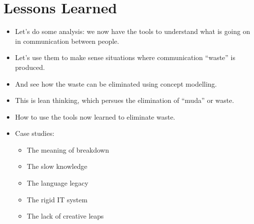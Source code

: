 \section{Lessons Learned}
\begin{itemize}
    \item Let's do some analysis: we now have the tools to understand what is going on in communication between people.
    \item Let's use them to make sense situations where communication ``waste'' is produced. 
    \item And see how the waste can be eliminated using concept modelling.
    \item This is lean thinking, which persues the elimination of ``muda'' or waste.
    \item How to use the tools now learned to eliminate waste.
    \item Case studies:
        \begin{itemize}
            \item The meaning of breakdown 
            \item The slow knowledge 
            \item The language legacy 
            \item The rigid IT system
            \item The lack of creative leaps
        \end{itemize}
\end{itemize}


